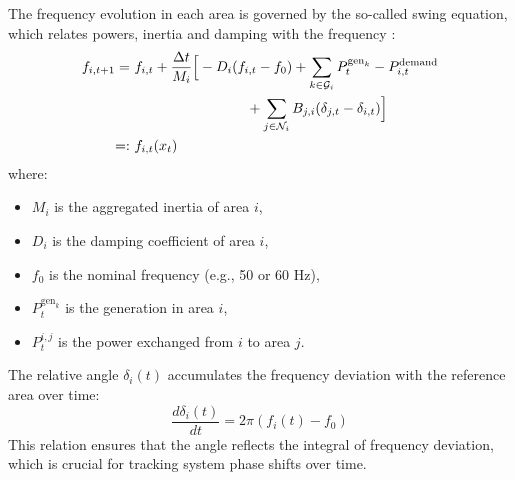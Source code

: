 \documentclass{article}
\begin{document}
The frequency evolution in each area is governed by the so-called swing equation, which relates powers, inertia and damping with the frequency \cite{qiu2020swing}:
\begin{align}
    f_{i,t+1} =\ & f_{i,t} + \frac{\Delta t}{M_i} \Big[ -D_i(f_{i,t} - f_0) 
    + \sum_{k \in \mathcal{G}_i} P^{\text{gen}_k}_t 
    - P^{\text{demand}}_{i,t} \notag \\
    &\qquad\qquad\qquad\qquad
    + \sum_{j \in \mathcal{N}_i} B_{j,i}(\delta_{j,t} - \delta_{i,t}) \Big] \\
    =:\ & f_{i,t}(x_t)
\end{align}
where:
\begin{itemize}
    \item $M_i$ is the aggregated inertia of area $i$,
    \item $D_i$ is the damping coefficient of area $i$,
    \item $f_0$ is the nominal frequency (e.g., 50 or 60 Hz),
    \item $P^{\text{gen}_k}_t$ is the generation in area $i$,
    \item $P^{i,j}_t$ is the power exchanged from $i$ to area $j$.
\end{itemize}

The relative angle $\delta_i(t)$ accumulates the frequency deviation with the reference area over time:
\begin{equation}
    \frac{d\delta_i(t)}{dt} = 2\pi(f_i(t) - f_0)
\end{equation}
This relation ensures that the angle reflects the integral of frequency deviation, which is crucial for tracking system phase shifts over time. 
\end{document}
